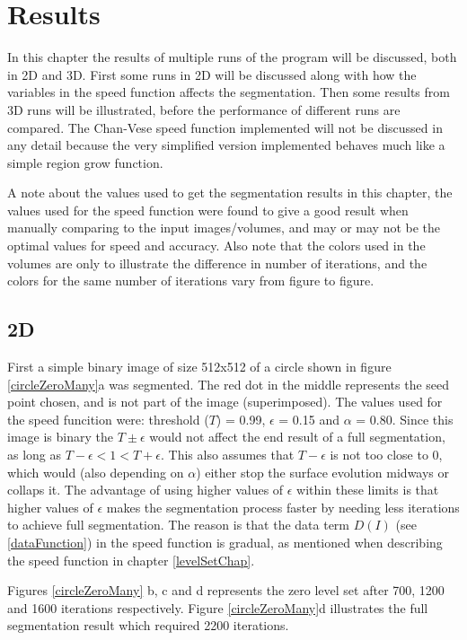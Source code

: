 \chapter{Results}
In this chapter the results of multiple runs of the program will be discussed, both in 2D and 3D. First some runs in 2D will be discussed along with how the variables in the speed function affects the segmentation. Then some results from 3D runs will be illustrated, before the performance of different runs are compared. The Chan-Vese speed function implemented will not be discussed in any detail because the very simplified version implemented behaves much like a simple region grow function.

A note about the values used to get the segmentation results in this chapter, the values used for the speed function were found to give a good result when manually comparing to the input images/volumes, and may or may not be the optimal values for speed and accuracy. Also note that the colors used in the volumes are only to illustrate the difference in number of iterations, and the colors for the same number of iterations vary from figure to figure.

\section{2D}
First a simple binary image of size 512x512 of a circle shown in figure \ref{circleZeroMany}a was segmented. The red dot in the middle represents the seed point chosen, and is not part of the image (superimposed). The values used for the speed funcition were: threshold ($T$) = 0.99, $\epsilon$ = 0.15 and $\alpha$ = 0.80. Since this image is binary the $T \pm \epsilon$ would not affect the end result of a full segmentation, as long as $T - \epsilon < 1 < T + \epsilon$. This also assumes that $T - \epsilon$ is not too close to 0, which would (also depending on $\alpha$) either stop the surface evolution midways or collaps it. The advantage of using higher values of $\epsilon$ within these limits is that higher values of $\epsilon$ makes the segmentation process faster by needing less iterations to achieve full segmentation. The reason is that the data term $D(I)$ (see \ref{dataFunction}) in the speed function is gradual, as mentioned when describing the speed function in chapter \ref{levelSetChap}.

Figures \ref{circleZeroMany} b, c and d represents the zero level set after 700, 1200 and 1600 iterations respectively. Figure \ref{circleZeroMany}d illustrates the full segmentation result which required 2200 iterations.

